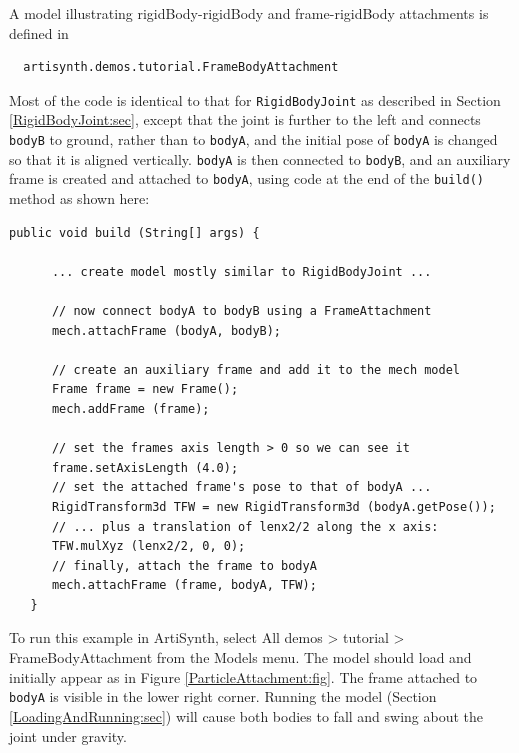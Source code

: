A model illustrating rigidBody-rigidBody and frame-rigidBody attachments
is defined in
%
\begin{verbatim}
  artisynth.demos.tutorial.FrameBodyAttachment
\end{verbatim}
%
Most of the code is identical to that for {\tt RigidBodyJoint}
as described in Section \ref{RigidBodyJoint:sec}, except that
the joint is further to the left and connects {\tt bodyB} to ground,
rather than to {\tt bodyA}, and the initial pose of {\tt bodyA}
is changed so that it is aligned vertically. {\tt bodyA} is
then connected to {\tt bodyB}, and an auxiliary frame is created
and attached to {\tt bodyA}, using code at the end
of the {\tt build()} method as shown here:
%
\lstset{numbers=left}
\begin{lstlisting}[]
   public void build (String[] args) {

      ... create model mostly similar to RigidBodyJoint ...

      // now connect bodyA to bodyB using a FrameAttachment
      mech.attachFrame (bodyA, bodyB);

      // create an auxiliary frame and add it to the mech model
      Frame frame = new Frame();
      mech.addFrame (frame);
      
      // set the frames axis length > 0 so we can see it
      frame.setAxisLength (4.0); 
      // set the attached frame's pose to that of bodyA ...
      RigidTransform3d TFW = new RigidTransform3d (bodyA.getPose());
      // ... plus a translation of lenx2/2 along the x axis:
      TFW.mulXyz (lenx2/2, 0, 0);
      // finally, attach the frame to bodyA
      mech.attachFrame (frame, bodyA, TFW);
   }
\end{lstlisting}
\lstset{numbers=none}
%
To run this example in ArtiSynth, select {\sf All demos > tutorial >
FrameBodyAttachment} from the {\sf Models} menu. The model should load
and initially appear as in Figure \ref{ParticleAttachment:fig}.  The
frame attached to {\tt bodyA} is visible in the lower right corner.
Running the model (Section \ref{LoadingAndRunning:sec}) will cause
both bodies to fall and swing about the joint under gravity.

\ifdefined\maindoc
\else

\fi
